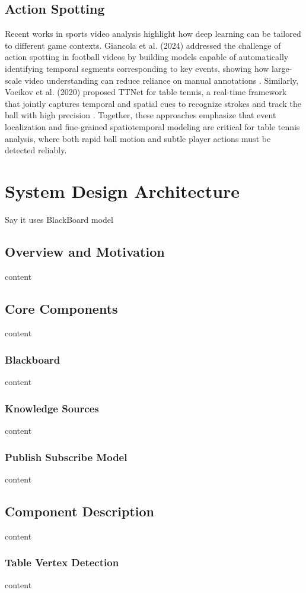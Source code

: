 \documentclass[conference]{IEEEtran}
\begin{document}
\subsection{Action Spotting}

Recent works in sports video analysis highlight how deep learning can be tailored to different game contexts. Giancola et al. (2024) addressed the challenge of action spotting in football videos by building models capable of automatically identifying temporal segments corresponding to key events, showing how large-scale video understanding can reduce reliance on manual annotations \cite{giancola}. Similarly, Voeikov et al. (2020) proposed TTNet for table tennis, a real-time framework that jointly captures temporal and spatial cues to recognize strokes and track the ball with high precision \cite{ttnet}. Together, these approaches emphasize that event localization and fine-grained spatiotemporal modeling are critical for table tennis analysis, where both rapid ball motion and subtle player actions must be detected reliably.

\section{System Design Architecture}
Say it uses BlackBoard model
\subsection{Overview and Motivation}
content
\subsection{Core Components}
content
\subsubsection{Blackboard}
content
\subsubsection{Knowledge Sources}
content
\subsubsection{Publish Subscribe Model}
content
\subsection{Component Description}
content
\subsubsection{Table Vertex Detection}
content
\end{document}
